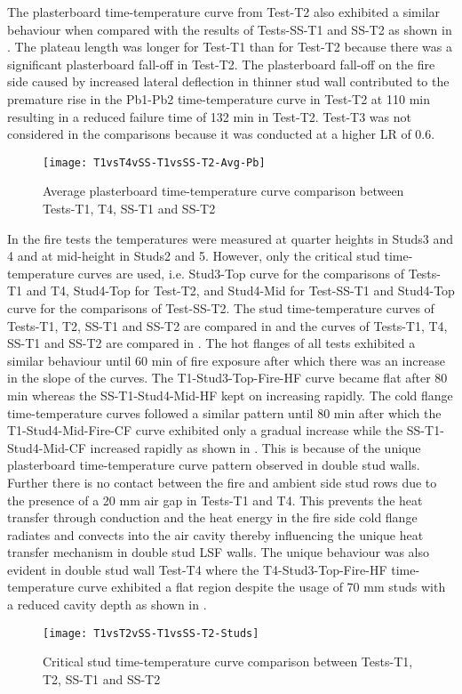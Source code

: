 The plasterboard time-temperature curve from Test-T2 also exhibited a similar behaviour when compared with the results of Tests-SS-T1 and SS-T2 as shown in . The plateau length was longer for Test-T1 than for Test-T2 because there was a significant plasterboard fall-off in Test-T2. The plasterboard fall-off on the fire side caused by increased lateral deflection in thinner stud wall contributed to the premature rise in the Pb1-Pb2 time-temperature curve in Test-T2 at 110 min resulting in a reduced failure time of 132 min in Test-T2. Test-T3 was not considered in the comparisons because it was conducted at a higher LR of 0.6. 
\begin{figure}[!htbp]
	\centering
		\texttt{[image: T1vsT4vSS-T1vsSS-T2-Avg-Pb]}  
	\caption{Average plasterboard time-temperature curve comparison between Tests-T1, T4, SS-T1 and SS-T2}
	\label{fig:T1vsT4vSS-T1vsSS-T2-Avg-Pb}
\end{figure}

In the fire tests the temperatures were measured at quarter heights in Studs3 and 4 and at mid-height in Studs2 and 5. However, only the critical stud time-temperature curves are used, i.e. Stud3-Top curve for the comparisons of Tests-T1 and T4, Stud4-Top for Test-T2, and Stud4-Mid for Test-SS-T1 and Stud4-Top curve for the comparisons of Test-SS-T2. The stud time-temperature curves of Tests-T1, T2, SS-T1 and SS-T2 are compared in  and the curves of Tests-T1, T4, SS-T1 and SS-T2 are compared in . The hot flanges of all tests exhibited a similar behaviour until 60 min of fire exposure after which there was an increase in the slope of the curves. The T1-Stud3-Top-Fire-HF curve became flat after 80 min whereas the SS-T1-Stud4-Mid-HF kept on increasing rapidly. The cold flange time-temperature curves followed a similar pattern until 80 min after which the T1-Stud4-Mid-Fire-CF curve exhibited only a gradual increase while the SS-T1-Stud4-Mid-CF increased rapidly as shown in . This is because of the unique plasterboard time-temperature curve pattern observed in double stud walls. Further there is no contact between the fire and ambient side stud rows due to the presence of a 20 mm air gap in Tests-T1 and T4. This prevents the heat transfer through conduction and the heat energy in the fire side cold flange radiates and convects into the air cavity thereby influencing the unique heat transfer mechanism in double stud LSF walls. The unique behaviour was also evident in double stud wall Test-T4 where the T4-Stud3-Top-Fire-HF time-temperature curve exhibited a flat region despite the usage of 70 mm studs with a reduced cavity depth as shown in .
\begin{figure}[!htbp]
	\centering
		\texttt{[image: T1vsT2vSS-T1vsSS-T2-Studs]}  
	\caption{Critical stud time-temperature curve comparison between Tests-T1, T2, SS-T1 and SS-T2}
	\label{fig:T1vsT2vSS-T1vsSS-T2-Studs}
\end{figure}

